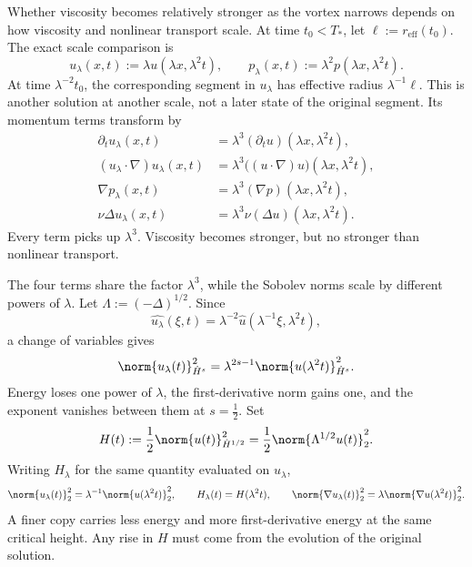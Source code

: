 
Whether viscosity becomes relatively stronger as the vortex narrows depends on how viscosity and nonlinear transport scale.
At time \(t_0<T_*\), let \(\ell:=r_{\mathrm{eff}}(t_0)\). The exact scale comparison is
\[
  u_\lambda(x,t)
  :=
  \lambda u(\lambda x,\lambda^2t),
  \qquad
  p_\lambda(x,t)
  :=
  \lambda^2p(\lambda x,\lambda^2t).
\]
At time \(\lambda^{-2}t_0\), the corresponding segment in \(u_\lambda\) has effective radius \(\lambda^{-1}\ell\). This is another solution at another scale, not a later state of the original segment. Its momentum terms transform by
\[
\begin{aligned}
  \partial_tu_\lambda(x,t)
  &=
  \lambda^3(\partial_tu)(\lambda x,\lambda^2t),
  \\
  (u_\lambda\cdot\nabla)u_\lambda(x,t)
  &=
  \lambda^3\bigl((u\cdot\nabla)u\bigr)(\lambda x,\lambda^2t),
  \\
  \nabla p_\lambda(x,t)
  &=
  \lambda^3(\nabla p)(\lambda x,\lambda^2t),
  \\
  \nu\Delta u_\lambda(x,t)
  &=
  \lambda^3\nu(\Delta u)(\lambda x,\lambda^2t).
\end{aligned}
\]
Every term picks up \(\lambda^3\). Viscosity becomes stronger, but no stronger than nonlinear transport.


The four terms share the factor \(\lambda^3\), while the Sobolev norms scale by different powers of \(\lambda\). Let \(\Lambda:=(-\Delta)^{1/2}\). Since
\[
  \widehat{u_\lambda}(\xi,t)
  =
  \lambda^{-2}\widehat u(\lambda^{-1}\xi,\lambda^2t),
\]
a change of variables gives
\[
  \norm{u_\lambda(t)}_{\dot H^s}^2
  =
  \lambda^{2s-1}
  \norm{u(\lambda^2t)}_{\dot H^s}^2.
\]
Energy loses one power of \(\lambda\), the first-derivative norm gains one, and the exponent vanishes between them at \(s=\tfrac12\). Set
\[
  H(t)
  :=
  \frac12\norm{u(t)}_{\dot H^{1/2}}^2
  =
  \frac12\norm{\Lambda^{1/2}u(t)}_2^2.
\]
Writing \(H_\lambda\) for the same quantity evaluated on \(u_\lambda\),
\[
  \norm{u_\lambda(t)}_2^2
  =
  \lambda^{-1}\norm{u(\lambda^2t)}_2^2,
  \qquad
  H_\lambda(t)=H(\lambda^2t),
  \qquad
  \norm{\nabla u_\lambda(t)}_2^2
  =
  \lambda\norm{\nabla u(\lambda^2t)}_2^2.
\]
A finer copy carries less energy and more first-derivative energy at the same critical height. Any rise in \(H\) must come from the evolution of the original solution.


